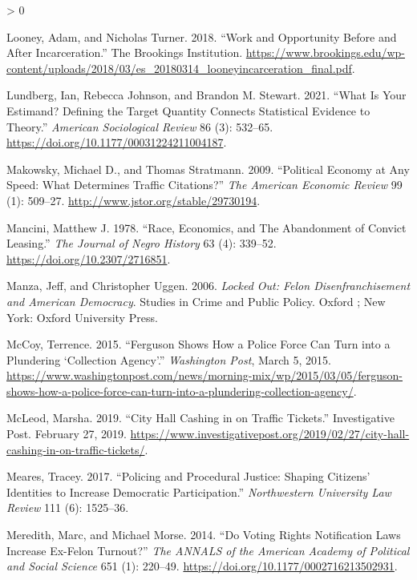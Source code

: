 \documentclass[
  12pt,
]{article}
\newlength{\cslhangindent}
\newenvironment{CSLReferences}[2] %
 {%
  \setlength{\parindent}{0pt}
  \ifodd #1 \everypar{\setlength{\hangindent}{\cslhangindent}}\ignorespaces\fi
  \ifnum #2 > 0
  \setlength{\parskip}{#2\baselineskip}
  \fi
 }%
 {}
\begin{document}
\begin{CSLReferences}{1}{0}
\leavevmode\hypertarget{ref-Looney2018}{}%
Looney, Adam, and Nicholas Turner. 2018. {``Work and Opportunity Before and After Incarceration.''} {The Brookings Institution}. \url{https://www.brookings.edu/wp-content/uploads/2018/03/es_20180314_looneyincarceration_final.pdf}.

\leavevmode\hypertarget{ref-Lundberg2021}{}%
Lundberg, Ian, Rebecca Johnson, and Brandon M. Stewart. 2021. {``What {Is Your Estimand}? {Defining} the {Target Quantity Connects Statistical Evidence} to {Theory}.''} \emph{American Sociological Review} 86 (3): 532--65. \url{https://doi.org/10.1177/00031224211004187}.

\leavevmode\hypertarget{ref-Makowsky2009}{}%
Makowsky, Michael D., and Thomas Stratmann. 2009. {``Political {Economy} at {Any Speed}: {What Determines Traffic Citations}?''} \emph{The American Economic Review} 99 (1): 509--27. \url{http://www.jstor.org/stable/29730194}.

\leavevmode\hypertarget{ref-Mancini1978}{}%
Mancini, Matthew J. 1978. {``Race, {Economics}, and {The Abandonment} of {Convict Leasing}.''} \emph{The Journal of Negro History} 63 (4): 339--52. \url{https://doi.org/10.2307/2716851}.

\leavevmode\hypertarget{ref-Manza2006}{}%
Manza, Jeff, and Christopher Uggen. 2006. \emph{Locked Out: Felon Disenfranchisement and {American} Democracy}. Studies in Crime and Public Policy. {Oxford ; New York}: {Oxford University Press}.

\leavevmode\hypertarget{ref-McCoy2015}{}%
McCoy, Terrence. 2015. {``Ferguson Shows How a Police Force Can Turn into a Plundering {`Collection Agency'}.''} \emph{Washington Post}, March 5, 2015. \url{https://www.washingtonpost.com/news/morning-mix/wp/2015/03/05/ferguson-shows-how-a-police-force-can-turn-into-a-plundering-collection-agency/}.

\leavevmode\hypertarget{ref-McLeod2019}{}%
McLeod, Marsha. 2019. {``City {Hall} Cashing in on Traffic Tickets.''} {Investigative Post}. February 27, 2019. \url{https://www.investigativepost.org/2019/02/27/city-hall-cashing-in-on-traffic-tickets/}.

\leavevmode\hypertarget{ref-Meares2017}{}%
Meares, Tracey. 2017. {``Policing and {Procedural Justice}: {Shaping Citizens}' {Identities} to {Increase Democratic Participation}.''} \emph{Northwestern University Law Review} 111 (6): 1525--36.

\leavevmode\hypertarget{ref-Meredith2014}{}%
Meredith, Marc, and Michael Morse. 2014. {``Do {Voting Rights Notification Laws Increase Ex}-{Felon Turnout}?''} \emph{The ANNALS of the American Academy of Political and Social Science} 651 (1): 220--49. \url{https://doi.org/10.1177/0002716213502931}.


\end{CSLReferences}
\end{document}
